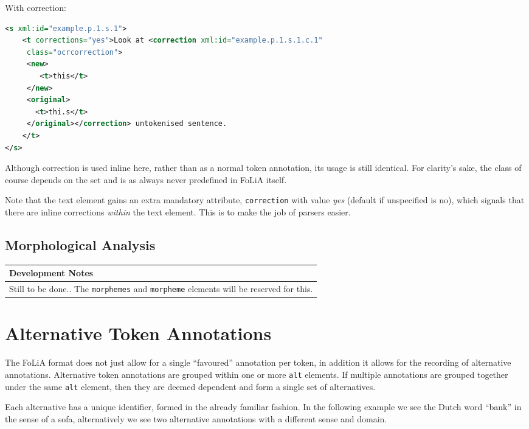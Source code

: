 \documentclass[a4paper,12pt]{report}
\newenvironment{devnotes}
{
\begin{center}
    \begin{tabular}[h!]{|p{0.8\textwidth}|}
    \hline
    {\bf Development Notes}\\\hline}
{   \\\hline
    \end{tabular}
\end{center}}
\begin{document}
With correction:

\begin{lstlisting}[language=xml]
<s xml:id="example.p.1.s.1">
    <t corrections="yes">Look at <correction xml:id="example.p.1.s.1.c.1"
     class="ocrcorrection">
     <new>
        <t>this</t>
     </new>
     <original>
       <t>thi.s</t>
     </original></correction> untokenised sentence.
    </t>
</s>                         
\end{lstlisting}

Although correction is used inline here, rather than as a normal token annotation, its usage is still identical. For clarity's sake, the class of course depends on the set and is as always never predefined in FoLiA itself.

Note that the text element gains an extra mandatory attribute, \texttt{correction} with value \emph{yes} (default if unspecified is no), which signals that there are inline corrections \emph{within} the text element. This is to make the job of parsers easier.

\subsection{Morphological Analysis}

\begin{devnotes}
Still to be done.. The \texttt{morphemes} and \texttt{morpheme} elements will be reserved for this.
\end{devnotes}


\section{Alternative Token Annotations}

The FoLiA format does not just allow for a single ``favoured'' annotation per token, in addition it allows for the recording of alternative annotations. Alternative token annotations are grouped within one or more \texttt{alt} elements. If multiple annotations are grouped together under the same \texttt{alt} element, then they are deemed dependent and form a single set of alternatives.

Each alternative has a unique identifier, formed in the already familiar fashion. In the following example we see the Dutch word ``bank'' in the sense of a sofa, alternatively we see two alternative annotations with a different sense and domain.
\end{document}
